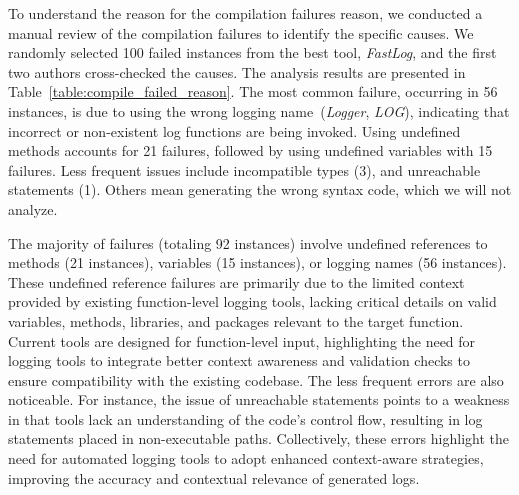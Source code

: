 

To understand the reason for the compilation failures reason, we conducted a manual review of the compilation failures to identify the specific causes. 
We randomly selected 100 failed instances from the best tool, \textit{FastLog}, and the first two authors cross-checked the causes. The analysis results are presented in Table~\ref{table:compile_failed_reason}. The most common failure, occurring in 56 instances, is due to using the wrong logging name~(\ie \textit{Logger}, \textit{LOG}), indicating that incorrect or non-existent log functions are being invoked. Using undefined methods accounts for 21 failures, followed by using undefined variables with 15 failures. Less frequent issues include incompatible types (3), and unreachable statements (1). Others mean generating the wrong syntax code, which we will not analyze.

The majority of failures (totaling 92 instances) involve undefined references to methods (21 instances), variables (15 instances), or logging names (56 instances). These undefined reference failures are primarily due to the limited context provided by existing function-level logging tools, lacking critical details on valid variables, methods, libraries, and packages relevant to the target function. Current tools are designed for function-level input, highlighting the need for logging tools to integrate better context awareness and validation checks to ensure compatibility with the existing codebase. The less frequent errors are also noticeable. For instance, the issue of unreachable statements points to a weakness in that tools lack an understanding of the code’s control flow, resulting in log statements placed in non-executable paths. Collectively, these errors highlight the need for automated logging tools to adopt enhanced context-aware strategies, improving the accuracy and contextual relevance of generated logs.




